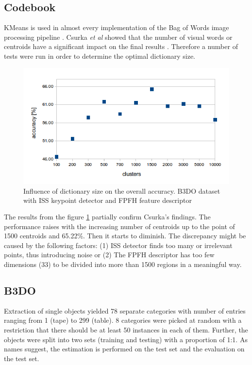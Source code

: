 	\subsection{Codebook}
	KMeans is used in almost every implementation of the Bag of Words image processing pipeline \cite{tsai2012bag, toldo2009bag}. Csurka \emph{et al} showed that the number of visual words or centroids have a significant impact on the final results \cite{csurka2004visual}. Therefore a number of tests were run in order to determine the optimal dictionary size.
	
	\begin{figure}[!ht]
	\centering	
	\includegraphics[width=.75\textwidth]{figs/clustering_centroids_b3do}
	\caption{Influence of dictionary size on the overall accuracy. B3DO dataset with ISS keypoint detector and FPFH feature descriptor}
	\label{fig:cluster_b3do}
	\end{figure}
	
	The results from the figure \ref{fig:cluster_b3do} partially confirm Csurka's findings. The performance raises with the increasing number of centroids up to the point of 1500 centroids and 65.22\%. Then it starts to diminish. The discrepancy might be caused by the following factors: (1) ISS detector finds too many or irrelevant points, thus introducing noise or (2) The FPFH descriptor has too few dimensions (33) to be divided into more than 1500 regions in a meaningful way. 

	
	\subsection{B3DO}
	Extraction of single objects yielded 78 separate categories with number of entries ranging from 1 (tape) to 299 (table). 8 categories were picked at random with a restriction that there should be at least 50 instances in each of them. Further, the objects were split into two sets (training and testing) with a proportion of 1:1. As names suggest, the estimation is performed on the test set and the evaluation on the test set.
	
